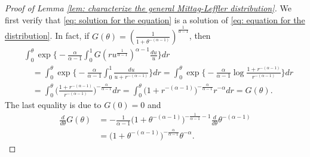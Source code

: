\documentclass[12pt,a4paper]{amsart}
\theoremstyle{definition}
\numberwithin{equation}{section}
\begin{document}
\begin{proof}[Proof of Lemma \ref{lem: characterize the general Mittag-Leffler distribution}]
	We first verify that \eqref{eq: solution for the equation}  is a solution of \eqref{eq: equation for the distribution}.
	In fact, if $G(\theta) = (\frac{1}{1+ \theta^{-(\alpha - 1)}})^{\frac{1}{\alpha - 1}}$, then
  \begin{align}
    & \int_0^\theta \exp\Big\{- \frac{\alpha} {\alpha - 1} \int_0^1 G(ru^{\frac{1}{\alpha - 1}})^{\alpha - 1}\frac{du}{u}\Big\} dr
    \\ & \quad = \int_0^\theta \exp\Big\{- \frac{\alpha} {\alpha - 1} \int_0^1 \frac{du}{u+r^{-(\alpha - 1)}} \Big\} dr
         = \int_0^\theta \exp\Big\{- \frac{\alpha} {\alpha - 1} \log \frac {1+r^{-(\alpha - 1)}} {r^{-(\alpha - 1)} } \Big\} dr
    \\ & \quad = \int_0^\theta \big(\frac{1+r^{-(\alpha - 1)}}{r^{-(\alpha - 1)} }\big)^{- \frac{\alpha} {\alpha - 1}} dr
         = \int_0^\theta \big( 1 + r^{ - ( \alpha - 1 ) } \big)^{- \frac{\alpha} {\alpha - 1}} r^{-\alpha} dr
         = G(\theta).
  \end{align}
	The last equality is due to $G(0) = 0$ and
  \begin{align}
    \frac{d}{d\theta}G(\theta)
    &= - \frac{1}{\alpha - 1} \big(1+\theta^{-(\alpha - 1)}\big)^{- \frac{1}{\alpha - 1} - 1} \frac{d}{d\theta} \theta^{-(\alpha - 1)}
    \\& =  \big(1+\theta^{-(\alpha - 1)}\big)^{- \frac{\alpha}{\alpha - 1} } \theta^{-\alpha}.
\end{align}
	

\end{proof}
\end{document}
